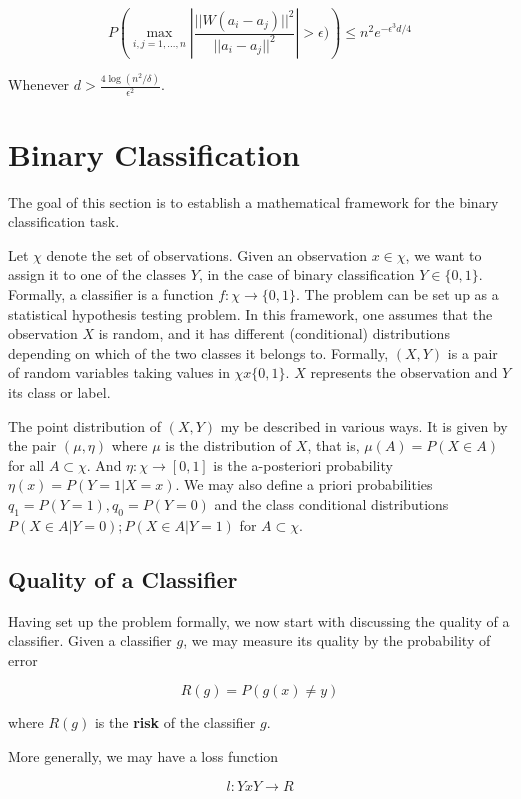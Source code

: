 \documentclass[12pt, authoryear]{elsarticle}
\begin{document}
$$P\left( \max_{i,j=1,...,n} \left| \frac{||W(a_i-a_j)||^2}{||a_i-a_j||^2}\right| > \epsilon )\right) \leq n^2 e^{-\epsilon^3 d/4}$$

Whenever $d > \frac{4 \log(n^2/\delta)}{\epsilon^2}$. 

\section{Binary Classification}

The goal of this section is to establish a mathematical framework for the binary classification task. 

Let $\chi$ denote the set of observations. Given an observation $x\in \chi$, we want to assign it to one of the classes $Y$, in the case of binary classification $Y \in \{0,1\}$. Formally, a classifier is a function $f: \chi \rightarrow \{0,1\}$. The problem can be set up as a statistical hypothesis testing problem. In this framework, one assumes that the observation $X$ is random, and it has different (conditional) distributions depending on which of the two classes it belongs to. Formally, $(X,Y)$ is a pair of random variables taking values in $ \chi x \{0,1\}$. $X$ represents the observation and $Y$ its class or label. 

The point distribution of $(X,Y)$ my be described in various ways. It is given by the pair $(\mu,\eta)$ where $\mu$ is the distribution of $X$, that is, $\mu (A) = P(X \in A)$ for all $A \subset \chi$.  And $\eta: \chi \rightarrow [0,1]$ is the a-posteriori probability $\eta(x) = P(Y=1 | X=x)$. We may also define a priori probabilities $q_1 = P(Y=1), q_0 = P(Y=0)$ and the class conditional distributions $P(X \in A | Y= 0); P(X \in A | Y = 1)$ for $A \subset \chi$. 

\subsection{Quality of a Classifier}

Having set up the problem formally, we now start with discussing the quality of a classifier. Given a classifier $g$, we may measure its quality by the probability of error

$$R(g) = P(g(x) \neq y)$$

where $R(g)$ is the \textbf{risk} of the classifier $g$. 

More generally, we may have a loss function 

$$ l: Y x Y \rightarrow R$$ 
\end{document}
